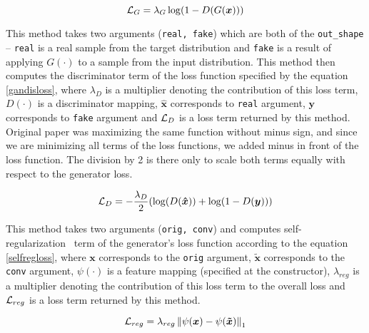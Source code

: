 \begin{itemize}
\begin{description}
\begin{equation}
\mathcal{L}_{G} = \lambda_G\log(1 - D(G(\bm{x})))
\label{origgangenloss}
\end{equation}

 This method takes two arguments (\texttt{real, fake}) which are both of the \texttt{out\_shape} -- \texttt{real} is a real sample from the target distribution and \texttt{fake} is a result of applying $G(\cdot)$ to a sample from the input distribution. This method then computes the discriminator term of the loss function specified by the equation \ref{gandisloss}, where $\lambda_D$ is a multiplier denoting the contribution of this loss term, $D(\cdot)$ is a discriminator mapping, $\bm{\hat{x}}$ corresponds to \texttt{real} argument, $\bm{y}$ corresponds to \texttt{fake} argument and $\mathcal{L}_D$ is a loss term returned by this method. Original paper was maximizing the same function without minus sign, and since we are minimizing all terms of the loss functions, we added minus in front of the loss function. The division by 2 is there only to scale both terms equally with respect to the generator loss.

\begin{equation}
\mathcal{L}_D = -\frac{\lambda_D}{2} (\log(D(\bm{\hat{x}})) + \log(1 - D(\bm{y})))
\label{gandisloss}
\end{equation}

 This method takes two arguments (\texttt{orig, conv}) and computes self-regularization~\cite{historypool} term of the generator's loss function according to the equation \ref{selfregloss}, where $\bm{x}$ corresponds to the \texttt{orig} argument, $\bm{\tilde{x}}$ corresponds to the \texttt{conv} argument, $\psi(\cdot)$ is a feature mapping (specified at the constructor), $\lambda_{reg}$ is a multiplier denoting the contribution of this loss term to the overall loss and $\mathcal{L}_{reg}$ is a loss term returned by this method.

\begin{equation}
\mathcal{L}_{reg} = \lambda_{reg}\left\lVert\psi(\bm{x}) - \psi(\bm{\tilde{x}})\right\rVert_1
\label{selfregloss}
\end{equation}

\end{description}


\end{itemize}
